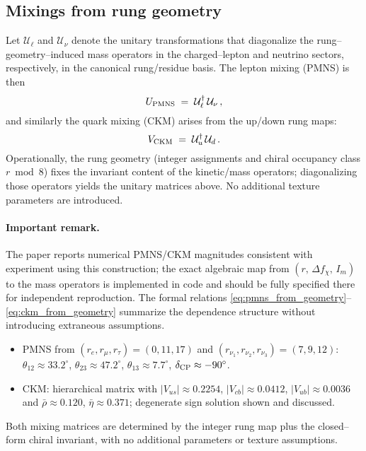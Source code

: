 \documentclass[%
  amsmath,amssymb,
  aps,
 prb,
 floatfix, showkeys
 ]{revtex4-2}
\begin{document}
 \subsection{Mixings from rung geometry}
 \label{subsec:mixing}
 Let $\mathcal{U}_\ell$ and $\mathcal{U}_\nu$ denote the unitary transformations that diagonalize the rung--geometry--induced mass operators in the charged--lepton and neutrino sectors, respectively, in the canonical rung/residue basis. The lepton mixing (PMNS) is then
 \begin{equation}
   U_{\rm PMNS} \;=\; \mathcal{U}_\ell^\dagger\,\mathcal{U}_\nu\,,
   \label{eq:pmns_from_geometry}
 \end{equation}
 and similarly the quark mixing (CKM) arises from the up/down rung maps:
 \begin{equation}
   V_{\rm CKM} \;=\; \mathcal{U}_u^\dagger\,\mathcal{U}_d\,.
   \label{eq:ckm_from_geometry}
 \end{equation}
 Operationally, the rung geometry (integer assignments and chiral occupancy class $r\bmod 8$) fixes the invariant content of the kinetic/mass operators; diagonalizing those operators yields the unitary matrices above. No additional texture parameters are introduced.
 
 \paragraph{ Important remark.}
 The paper reports numerical PMNS/CKM magnitudes consistent with experiment using this construction; the exact algebraic map from $(r,\,\Delta f_\chi,\,I_m)$ to the mass operators is implemented in code and should be fully specified there for independent reproduction. The formal relations \eqref{eq:pmns_from_geometry}–\eqref{eq:ckm_from_geometry} summarize the dependence structure without introducing extraneous assumptions.
 
 \begin{itemize}
   \item PMNS from $(r_e,r_\mu,r_\tau)=(0,11,17)$ and $(r_{\nu_1},r_{\nu_2},r_{\nu_3})=(7,9,12)$:
   $\theta_{12}\approx33.2^\circ$, $\theta_{23}\approx47.2^\circ$, $\theta_{13}\approx7.7^\circ$, $\delta_{\rm CP}\approx-90^\circ$.
   \item CKM: hierarchical matrix with $|V_{us}|\approx0.2254$, $|V_{cb}|\approx0.0412$, $|V_{ub}|\approx0.0036$ and $\bar\rho\approx0.120$, $\bar\eta\approx0.371$; degenerate sign solution shown and discussed.
 \end{itemize}
 Both mixing matrices are determined by the integer rung map plus the closed--form chiral invariant, with no additional parameters or texture assumptions.
 
\end{document}
